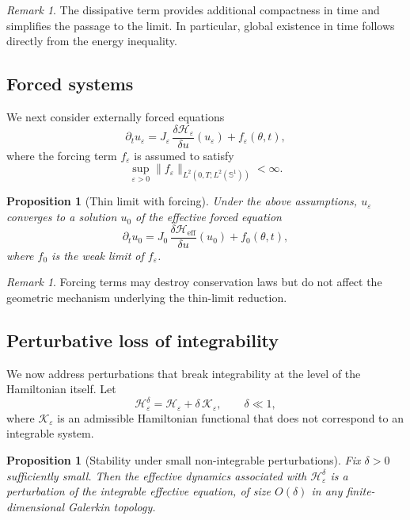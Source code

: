 \documentclass[11pt]{amsart}
\theoremstyle{plain}
\newtheorem{proposition}[theorem]{Proposition}
\theoremstyle{definition}
\theoremstyle{remark}
\newtheorem{remark}[theorem]{Remark}
\theoremstyle{remark}
\begin{document}
\begin{remark}
The dissipative term provides additional compactness in time and simplifies the
passage to the limit.
In particular, global existence in time follows directly from the energy
inequality.
\end{remark}

\subsection{Forced systems}

We next consider externally forced equations
\begin{equation}
\label{eq:forced}
\partial_t u_\varepsilon
=
J_\varepsilon\,\frac{\delta\mathcal H_\varepsilon}{\delta u}(u_\varepsilon)
+
f_\varepsilon(\theta,t),
\end{equation}
where the forcing term $f_\varepsilon$ is assumed to satisfy
\[
\sup_{\varepsilon>0}\|f_\varepsilon\|_{L^2(0,T;L^2(\mathbb S^1))}<\infty.
\]

\begin{proposition}[Thin limit with forcing]
\label{prop:forcing}
Under the above assumptions, $u_\varepsilon$ converges to a solution $u_0$ of the
effective forced equation
\[
\partial_t u_0
=
J_0\,\frac{\delta\mathcal H_{\mathrm{eff}}}{\delta u}(u_0)
+
f_0(\theta,t),
\]
where $f_0$ is the weak limit of $f_\varepsilon$.
\end{proposition}

\begin{remark}
Forcing terms may destroy conservation laws but do not affect the geometric
mechanism underlying the thin-limit reduction.
\end{remark}

\subsection{Perturbative loss of integrability}

We now address perturbations that break integrability at the level of the
Hamiltonian itself.
Let
\[
\mathcal H_\varepsilon^{\delta}
=
\mathcal H_\varepsilon
+
\delta\,\mathcal K_\varepsilon,
\qquad \delta\ll1,
\]
where $\mathcal K_\varepsilon$ is an admissible Hamiltonian functional that does
not correspond to an integrable system.

\begin{proposition}[Stability under small non-integrable perturbations]
\label{prop:small-perturb}
Fix $\delta>0$ sufficiently small.
Then the effective dynamics associated with
$\mathcal H_\varepsilon^{\delta}$
is a perturbation of the integrable effective equation, of size $O(\delta)$ in
any finite-dimensional Galerkin topology.
\end{proposition}
\end{document}
